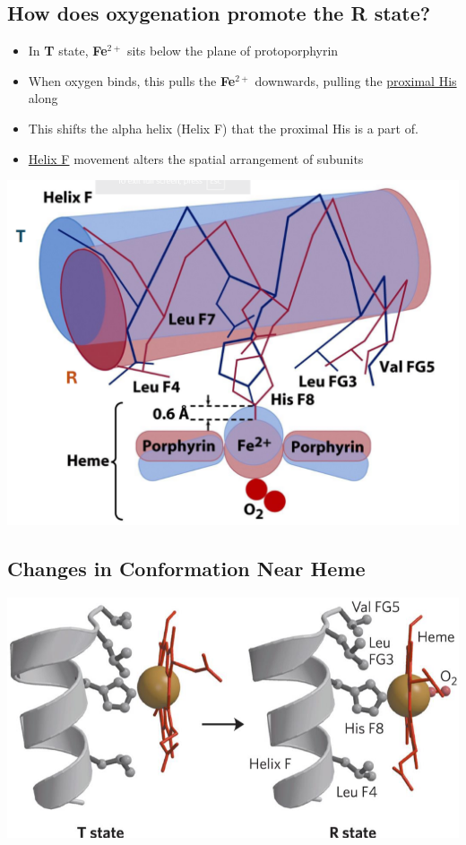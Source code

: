 \documentclass[10pt]{article}
\begin{document}
\subsection*{How does oxygenation promote the R state?}
\begin{itemize}
    \item In \textbf{T} state, \textbf{Fe$^{2+}$} sits below the plane of protoporphyrin
    \item When oxygen binds, this pulls the \textbf{Fe$^{2+}$} downwards, pulling the \underline{proximal His} along
    \item This shifts the alpha helix (Helix F) that the proximal His is a part of.
    \item \underline{Helix F} movement alters the spatial arrangement of subunits
\end{itemize}
\begin{center}
    \includegraphics*[scale=0.5]{L3_7.png}
\end{center}

\subsection*{Changes in Conformation Near Heme}
\begin{center}
    \includegraphics*[width=\textwidth]{L3_8.png}
\end{center}
\end{document}
